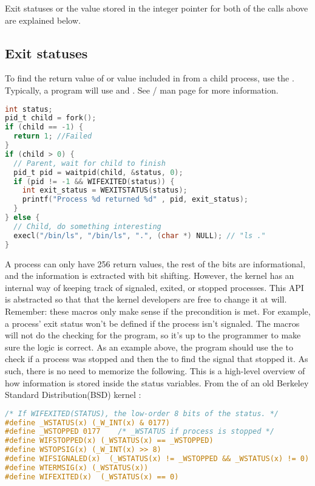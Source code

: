 Exit statuses or the value stored in the integer pointer for both of the calls above are explained below.

\subsection{Exit statuses}

To find the return value of  or value included in  from a child process, use the . Typically, a program will use  and .
See / man page for more information.

\begin{lstlisting}[language=C]
int status;
pid_t child = fork();
if (child == -1) {
  return 1; //Failed
}
if (child > 0) {
  // Parent, wait for child to finish
  pid_t pid = waitpid(child, &status, 0);
  if (pid != -1 && WIFEXITED(status)) {
    int exit_status = WEXITSTATUS(status);
    printf("Process %d returned %d" , pid, exit_status);
  }
} else {
  // Child, do something interesting
  execl("/bin/ls", "/bin/ls", ".", (char *) NULL); // "ls ."
}
\end{lstlisting}

A process can only have 256 return values, the rest of the bits are informational, and the information is extracted with bit shifting.
However, the kernel has an internal way of keeping track of signaled, exited, or stopped processes.
This API is abstracted so that that the kernel developers are free to change it at will.
Remember: these macros only make sense if the precondition is met.
For example, a process' exit status won't be defined if the process isn't signaled.
The macros will not do the checking for the program, so it's up to the programmer to make sure the logic is correct.
As an example above, the program should use the  to check if a process was stopped and then the  to find the signal that stopped it.
As such, there is no need to memorize the following. This is a high-level overview of how information is stored inside the status variables. From the  of an old Berkeley Standard Distribution(BSD) kernel \cite{sys/wait.h}:

\begin{lstlisting}[language=C]
/* If WIFEXITED(STATUS), the low-order 8 bits of the status. */
#define _WSTATUS(x) (_W_INT(x) & 0177)
#define _WSTOPPED 0177    /* _WSTATUS if process is stopped */
#define WIFSTOPPED(x) (_WSTATUS(x) == _WSTOPPED)
#define WSTOPSIG(x) (_W_INT(x) >> 8)
#define WIFSIGNALED(x)  (_WSTATUS(x) != _WSTOPPED && _WSTATUS(x) != 0)
#define WTERMSIG(x) (_WSTATUS(x))
#define WIFEXITED(x)  (_WSTATUS(x) == 0)
\end{lstlisting}

